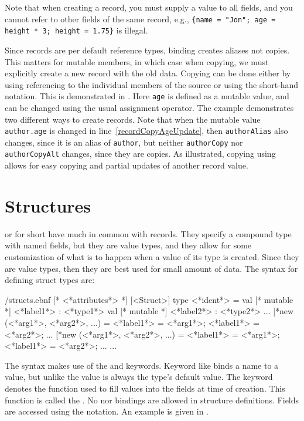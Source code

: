 Note that when creating a record, you must supply a value to all fields, and you cannot refer to other fields of the same record, e.g., \lstinline!{name = "Jon"; age = height * 3; height = 1.75}! is illegal.

Since records are per default reference types, binding creates aliases not copies. This matters for mutable members, in which case when copying, we must explicitly create a new record with the old data. Copying can be done either by using referencing to the individual members of the source or using the short-hand  notation. This is demonstrated in .
%
%
Here \lstinline{age} is defined as a mutable value, and can be changed using the usual \lexeme{<-} assignment operator. The example demonstrates two different ways to create records. Note that when the mutable value \lstinline{author.age} is changed in line~\ref{recordCopyAgeUpdate}, then \lstinline{authorAlias} also changes, since it is an alias of \lstinline{author}, but neither \lstinline{authorCopy} nor \lstinline{authorCopyAlt} changes, since they are copies. As illustrated, copying using  allows for easy copying and partial updates of another record value.

\section{Structures}
\label{sec:structs}
 or  for short have much in common with records. They specify a compound type with named fields, but they are value types, and they allow for some customization of what is to happen when a value of its type is created. Since they are value types, then they are best used for small amount of data. The syntax for defining struct types are:
%
\begin{verbatimwrite}{\ebnf/structs.ebnf}
[* <*attributes*> *] 
[<Struct>] 
type <*ident*> =
  val [* mutable *] <*label1*> : <*type1*>
  val [* mutable *] <*label2*> : <*type2*>
  ...
  [*new (<*arg1*>, <*arg2*>, ...) = {<*label1*> = <*arg1*>; <*label1*> = <*arg2*>; ...}
  [*new (<*arg1*>, <*arg2*>, ...) = {<*label1*> = <*arg1*>; <*label1*> = <*arg2*>; ...}
  ...
\end{verbatimwrite}
%
The syntax makes use of the  and  keywords. Keyword  like  binds a name to a value, but unlike  the value is always the type's default value. The  keyword denotes the function used to fill values into the fields at time of creation. This function is called the . No  nor  bindings are allowed in structure definitions. Fields are accessed using the  notation. An example is given in .
%
%

